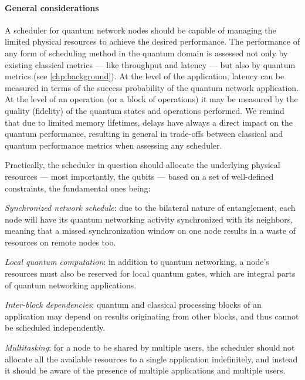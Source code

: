 \paragraph{General considerations}

A scheduler for quantum network nodes should be capable of managing the limited physical resources
to achieve the desired performance. The performance of any form of scheduling method in the quantum
domain is assessed not only by existing classical metrics --- like throughput and latency --- but
also by quantum metrics (see \cref{chp:background}). At the level of the application, latency can be
measured in terms of the success probability of the quantum network application. At the level of an
operation (or a block of operations) it may be measured by the quality (fidelity) of the quantum
states and operations performed. We remind that due to limited memory lifetimes, delays have always
a direct impact on the quantum performance, resulting in general in trade-offs between classical and
quantum performance metrics when assessing any scheduler.

Practically, the scheduler in question should allocate the underlying physical resources --- most
importantly, the qubits --- based on a set of well-defined constraints, the fundamental ones being:
%
\begin{inlinelist}
    \item \emph{Synchronized network schedule}: due to the bilateral nature of entanglement, each
          node will have its quantum networking activity synchronized with its neighbors, meaning
          that a missed synchronization window on one node results in a waste of resources on remote
          nodes too.
    \item \emph{Local quantum computation}: in addition to quantum networking, a node's resources
          must also be reserved for local quantum gates, which are integral parts of quantum
          networking applications.
    \item \emph{Inter-block dependencies}: quantum and classical processing blocks of an application
          may depend on results originating from other blocks, and thus cannot be scheduled
          independently.
    \item \emph{Multitasking}: for a node to be shared by multiple users, the scheduler should not
          allocate all the available resources to a single application indefinitely, and instead it
          should be aware of the presence of multiple applications and multiple users.
\end{inlinelist}

